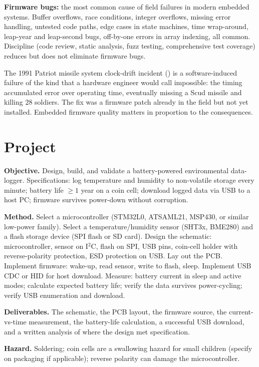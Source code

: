 \textbf{Firmware bugs:} the most common cause of field failures in modern embedded systems. Buffer overflows, race conditions, integer overflows, missing error handling, untested code paths, edge cases in state machines, time wrap-around, leap-year and leap-second bugs, off-by-one errors in array indexing, all common. Discipline (code review, static analysis, fuzz testing, comprehensive test coverage) reduces but does not eliminate firmware bugs.

The 1991 Patriot missile system clock-drift incident (\cite{acc:gao-patriot-1992}) is a software-induced failure of the kind that a hardware engineer would call impossible: the timing accumulated error over operating time, eventually missing a Scud missile and killing $28$ soldiers. The fix was a firmware patch already in the field but not yet installed. Embedded firmware quality matters in proportion to the consequences.

\section{Project}

\begin{project}
\textbf{Objective.} Design, build, and validate a battery-powered environmental data-logger. Specifications: log temperature and humidity to non-volatile storage every minute; battery life $\geq 1$ year on a coin cell; download logged data via USB to a host PC; firmware survives power-down without corruption.

\textbf{Method.} Select a microcontroller (STM32L0, ATSAML21, MSP430, or similar low-power family). Select a temperature/humidity sensor (SHT3x, BME280) and a flash storage device (SPI flash or SD card). Design the schematic: microcontroller, sensor on I$^2$C, flash on SPI, USB pins, coin-cell holder with reverse-polarity protection, ESD protection on USB. Lay out the PCB. Implement firmware: wake-up, read sensor, write to flash, sleep. Implement USB CDC or HID for host download. Measure: battery current in sleep and active modes; calculate expected battery life; verify the data survives power-cycling; verify USB enumeration and download.

\textbf{Deliverables.} The schematic, the PCB layout, the firmware source, the current-vs-time measurement, the battery-life calculation, a successful USB download, and a written analysis of where the design met specification.

\textbf{Hazard.} Soldering; coin cells are a swallowing hazard for small children (specify on packaging if applicable); reverse polarity can damage the microcontroller.
\end{project}

